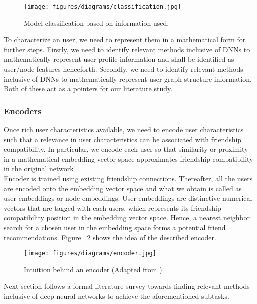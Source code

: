\documentclass{kththesis}
\begin{document}
\begin{figure}[h!]
\centering
\texttt{[image: figures/diagrams/classification.jpg]}
\caption{Model classification based on information used.}
\label{fig:classification}
\end{figure}

To characterize an user, we need to represent them in a mathematical form for further steps. Firstly, we need to identify relevant methods inclusive of DNNs to mathematically represent user profile information and shall be identified as user/node features henceforth. Secondly, we need to identify relevant methods inclusive of DNNs to mathematically represent user graph structure information. Both of these act as a pointers for our literature study.\\

\subsubsection{Encoders}
\noindent Once rich user characteristics available, we need to encode user characteristics such that a relevance in user characteristics can be associated with friendship compatibility. In particular, we encode each user so that similarity or proximity in a mathematical embedding vector space approximates friendship compatibility in the original network \cite{jure}.\\

Encoder is trained using existing friendship connections. Thereafter, all the users are encoded onto the embedding vector space and what we obtain is called as user embeddings or node embeddings. User embeddings are distinctive numerical vectors that are tagged with each users, which represents its friendship compatibility position in the embedding vector space. Hence, a nearest neighbor search for a chosen user in the embedding space forms a potential friend recommendations. Figure ~\ref{fig:encoder} shows the idea of the described encoder. 

\begin{figure}[h!]
\centering
\texttt{[image: figures/diagrams/encoder.jpg]}
\caption{Intuition behind an encoder (Adapted from \cite{jure})}
\label{fig:encoder}
\end{figure}

Next section follows a formal literature survey towards finding relevant methods inclusive of deep neural networks to achieve the aforementioned subtasks.

\end{document}
